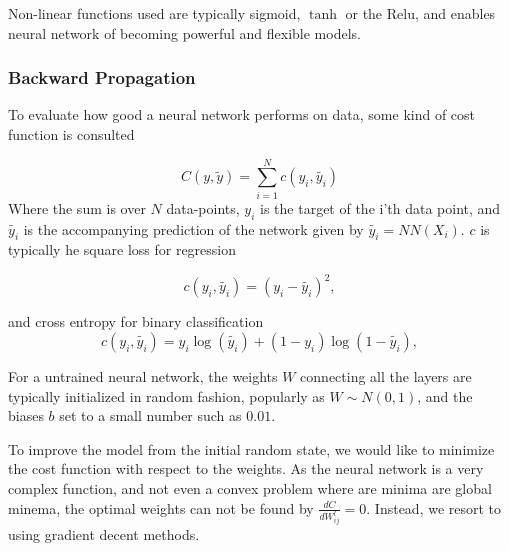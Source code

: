 Non-linear functions used are typically sigmoid, $\tanh$ or the Relu, and enables neural network of becoming powerful and flexible models.

\subsubsection{Backward Propagation}
To evaluate how good a neural network performs on data, some kind of 
cost function is consulted

\begin{equation}\label{eq:cost}
    C(y, \tilde{y}) = \sum_{i=1}^N c(y_i, \tilde{y_i}) 
\end{equation}
Where the sum is over $N$ data-points, $y_i$ is the target of the i'th data point,
and $\tilde{y_i}$ is the accompanying prediction of the network given by $\tilde{y_i} = NN(X_i)$. $c$ is typically he square loss for regression

\begin{equation}\label{eq:square_loss}
    c(y_i, \tilde{y_i}) = (y_i - \tilde{y_i})^2,
\end{equation}

and cross entropy for binary classification
\begin{equation}\label{eq:square_loss}
    c(y_i, \tilde{y_i}) = y_i\log(\tilde{y_i}) + (1 - y_i)\log(1 - \tilde{y_i}),
\end{equation}

For a untrained neural network, the weights $W$ connecting all the layers are typically initialized in random fashion, popularly as $W \sim N(0,1)$, and the biases $b$ set to a small number such as $0.01$. 

To improve the model from the initial random state, we would like to minimize the cost function with respect to the weights. As the neural network is a very complex function, and not even a convex problem where are minima are global minema, the optimal weights can not be found by $\frac{dC}{dW^l_{ij}} = 0$. Instead, we resort to using gradient decent methods.
